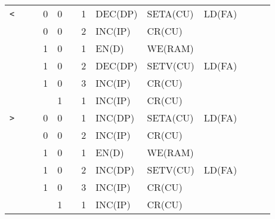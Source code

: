 \begin{footnotesize}
\begin{longtable}[c] {c|ccccc|c|llllll}
    \rowcolor{Gray}  \texttt{<}   &   &   & 0 & 0     &      & 1     & DEC(DP)   & SETA(CU) & LD(FA)  &        &        &        \\
    \rowcolor{Gray}               &   &   & 0 & 0     &      & 2     & INC(IP)  & CR(CU)   &         &        &        &        \\    
    \rowcolor{White}              &   &   & 1 & 0     &      & 1     & EN(D)    & WE(RAM)  &         &        &        &        \\
    \rowcolor{White}              &   &   & 1 & 0     &      & 2     & DEC(DP)   & SETV(CU) & LD(FA)  &        &        &        \\
    \rowcolor{White}              &   &   & 1 & 0     &      & 3     & INC(IP)  & CR(CU)   &         &        &        &        \\
    \rowcolor{Gray}               &   &   &   & 1     &      & 1     & INC(IP)  & CR(CU)   &         &        &        &        \\ \hline

    \rowcolor{Gray}  \texttt{>}   &   &   & 0 & 0     &      & 1     & INC(DP)   & SETA(CU) & LD(FA)  &        &        &        \\
    \rowcolor{Gray}               &   &   & 0 & 0     &      & 2     & INC(IP)  & CR(CU)   &         &        &        &        \\    
    \rowcolor{White}              &   &   & 1 & 0     &      & 1     & EN(D)    & WE(RAM)  &         &        &        &        \\
    \rowcolor{White}              &   &   & 1 & 0     &      & 2     & INC(DP)   & SETV(CU) & LD(FA)  &        &        &        \\
    \rowcolor{White}              &   &   & 1 & 0     &      & 3     & INC(IP)  & CR(CU)   &         &        &        &        \\
    \rowcolor{Gray}               &   &   &   & 1     &      & 1     & INC(IP)  & CR(CU)   &         &        &        &        \\ \hline


\end{longtable}
\end{footnotesize}

